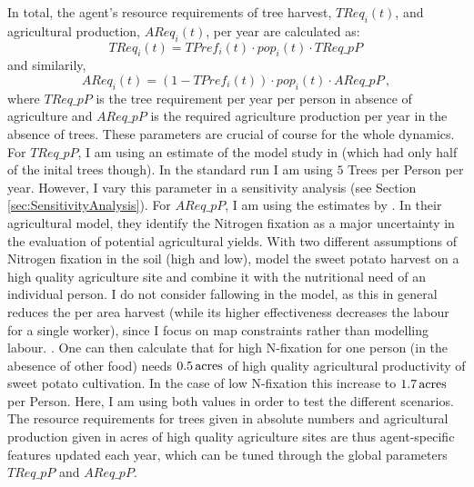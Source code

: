 In total, the agent's resource requirements of tree harvest, $TReq_i(t)$, and agricultural production, $AReq_i(t)$, per year are calculated as:
\begin{equation}
TReq_i(t) = TPref_i(t) \cdot pop_i(t) \cdot TReq\_pP \, 
\end{equation}
and similarily, 
\begin{equation}
AReq_i(t) = (1-TPref_i(t)) \cdot pop_i(t) \cdot AReq\_pP\, , 
\end{equation}
where $TReq\_pP$ is the tree requirement per year per person in absence of agriculture and $AReq\_pP$ is the required agriculture production per year in the absence of trees.
These parameters are crucial of course for the whole dynamics. 
For $TReq\_pP$, I am using an estimate of the model study in \citet{Brandt2015} (which had only half of the inital trees though). 
In the standard run I am using $5$ Trees per Person per year. However, I vary this parameter in a sensitivity analysis (see Section \ref{sec:SensitivityAnalysis}).
For $AReq\_pP$, I am using the estimates by \citet{Puleston2017}. In their agricultural model, they identify the Nitrogen fixation as a major uncertainty in the evaluation of potential agricultural yields. 
With two different assumptions of Nitrogen fixation in the soil (high and low), \citet{Puleston2017} model the sweet potato harvest on a high quality agriculture site and combine it with the nutritional need of an individual person.
I do not consider fallowing in the model, as this in general reduces the per area harvest (while its higher effectiveness decreases the labour for a single worker), since I focus on map constraints rather than modelling labour. .
One can then calculate that for high N-fixation for one person (in the abesence of other food) needs $0.5\, \rm{acres}$ of high quality agricultural productivity of sweet potato cultivation.
In the case of low N-fixation this increase to $1.7\, \rm{acres}$ per Person. 
Here, I am using both values in order to test the different scenarios.
The resource requirements for trees given in absolute numbers and agricultural production given in acres of high quality agriculture sites are thus agent-specific features updated each year, which can be tuned through the global parameters $TReq\_pP$ and $AReq\_pP$.


